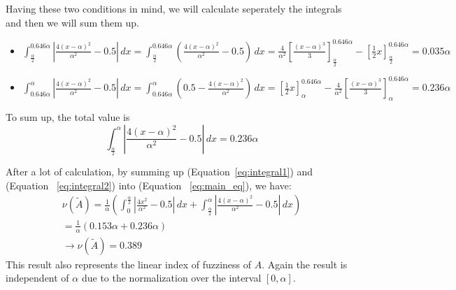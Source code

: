 Having these two conditions in mind, we will calculate seperately the integrals and then we will sum them up.
\begin{itemize}
	\item $\displaystyle \int_{\frac{\alpha}{2}}^{0.646\alpha} \left| \frac{4(x-\alpha)^2}{\alpha^2} - 0.5 \right| \, dx = \int_{\frac{\alpha}{2}}^{0.646\alpha}\left(\frac{4(x-\alpha)^2}{\alpha^2} - 0.5 \right)\, dx =  \frac{4}{\alpha^2}\left[\frac{\left(x - \alpha\right)^3}{3}\right]^{0.646\alpha}_{\frac{\alpha}{2}} - \left[\frac{1}{2}x\right]^{0.646\alpha}_{\frac{\alpha}{2}} = 0.035\alpha $ 
	\vspace{3mm}
	
	\item $\displaystyle \int_{0.646\alpha}^{\alpha} \left| \frac{4(x-\alpha)^2}{\alpha^2} - 0.5 \right| \, dx =\int_{0.646\alpha}^{\alpha} \left(0.5 - \frac{4(x-\alpha)^2}{\alpha^2} \right) \, dx = \left[\frac{1}{2}x\right]^{0.646\alpha}_{\alpha} -  \frac{4}{\alpha^2}\left[\frac{\left(x - \alpha\right)^3}{3}\right]^{0.646\alpha}_{\alpha} =
	 0.236\alpha
$\end{itemize}

To sum up, the total value is \\
\begin{equation}
	\displaystyle \int_{\frac{\alpha}{2}}^{\alpha} \left| \frac{4(x-\alpha)^2}{\alpha^2} - 0.5 \right| \, dx = 0.236\alpha
\end{equation}
\label{eq:integral2}

After a lot of calculation, by summing up (Equation~\ref{eq:integral1}) and (Equation ~\ref{eq:integral2}) into (Equation ~\ref{eq:main_eq}), we have:
\begin{gather}
	\nu(\tilde{A}) = \frac{1}{\alpha} \left( \int_{0}^{\frac{\alpha}{2}} \left| \frac{4x^2}{\alpha^2} - 0.5 \right| \, dx + \int_{\frac{\alpha}{2}}^{\alpha} \left| \frac{4(x-\alpha)^2}{\alpha^2} - 0.5 \right| \, dx \right) \\
	= \frac{1}{\alpha}\left(0.153\alpha + 0.236\alpha \right) \\
	\rightarrow \nu(\tilde{A}) = 0.389
\end{gather}
This result also represents the linear index of fuzziness of $A$. Again the result is independent of $\alpha$ due to the normalization over the interval $[0,\alpha]$.
\vspace{4mm}




